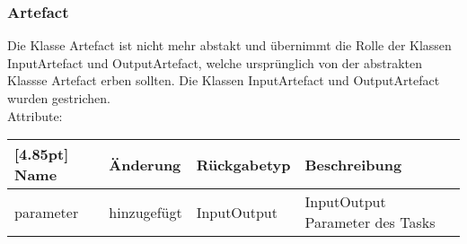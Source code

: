 

		\subsubsection{Artefact} Die Klasse Artefact ist nicht mehr abstakt und übernimmt die Rolle der Klassen InputArtefact und OutputArtefact, welche ursprünglich von der abstrakten Klassse Artefact erben sollten. Die Klassen InputArtefact und OutputArtefact wurden gestrichen. \\

			Attribute:
			\begin{center}
				\setlength\tabcolsep{5pt}
				\renewcommand{\arraystretch}{1.5}
				
				\begin{tabularx}{\textwidth}{|l|l|l|X|}
					\hline
					\rowcolor[gray]{0.75}[4.85pt]
					Name & Änderung  & Rückgabetyp & Beschreibung \\ \hline 
					parameter & hinzugefügt & InputOutput & InputOutput Parameter des Tasks \\ \hline
				\end{tabularx}
			\end{center}
